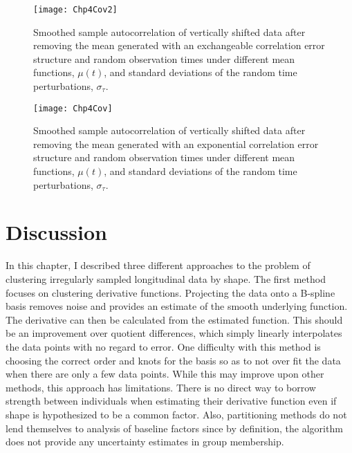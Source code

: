\begin{landscape}
\begin{figure}
\begin{center}
\texttt{[image: Chp4Cov2]}
\end{center}
\caption{Smoothed sample autocorrelation of vertically shifted data after removing the mean generated with an exchangeable correlation error structure and random observation times under different mean functions, $\mu(t)$, and standard deviations of the random time perturbations, $\sigma_{\tau}$.}
\label{fig:cov1}
\end{figure}

\begin{figure}
\begin{center}
\texttt{[image: Chp4Cov]}
\end{center}
\caption{Smoothed sample autocorrelation of vertically shifted data after removing the mean generated with an exponential correlation error structure and random observation times under different mean functions, $\mu(t)$, and standard deviations of the random time perturbations, $\sigma_{\tau}$.}
\label{fig:cov}
\end{figure}
\end{landscape}



\section{Discussion}
In this chapter, I described three different approaches to the problem of clustering irregularly sampled longitudinal data by shape. The first method focuses on clustering derivative functions. Projecting the data onto a B-spline basis removes noise and provides an estimate of the smooth underlying function. The derivative can then be calculated from the estimated function. This should be an improvement over quotient differences, which simply linearly interpolates the data points with no regard to error. One difficulty with this method is choosing the correct order and knots for the basis so as to not over fit the data when there are only a few data points. While this may improve upon other methods, this approach has limitations. There is no direct way to borrow strength between individuals when estimating their derivative function even if shape is hypothesized to be a common factor. Also, partitioning methods do not lend themselves to analysis of baseline factors since by definition, the algorithm does not provide any uncertainty estimates in group membership.  

